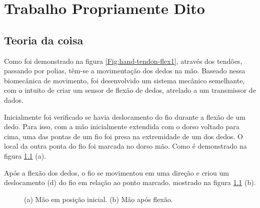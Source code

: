 \documentclass[
	12pt,				%
	openright,			%
	oneside,			%
	a4paper,			%
	english,			%
	brazil				%
	]{abntex2}
\begin{document}
	\chapter{Trabalho Propriamente Dito}

		\section{Teoria da coisa}
			Como foi demonstrado na figura \ref{Fig:hand-tendon-flex1}, através dos tendões, passando por polias, têm-se a movimentação dos dedos na mão. Baseado nessa biomecânica de movimento, foi desenvolvido um sistema mecânico semelhante, com o intuito de criar um sensor de flexão de dedos, atrelado a um transmissor de dados.
			
			Inicialmente foi verificado se havia deslocamento do fio durante a flexão de um dedo. Para isso, com a mão inicialmente extendida com o dorso voltado para cima, uma das pontas de um fio foi presa na extremidade de um dos dedos. O local da outra ponta do fio foi marcada no dorso mão. Como é demonstrado na figura \ref{Fig:hand-wire-steady-and-flex} (a).

			Após a flexão dos dedos, o fio se movimentou em uma direção e criou um deslocamento (d) do fio em relação ao ponto marcado, mostrado na figura \ref{Fig:hand-wire-steady-and-flex} (b).

 

\begin{figure}[!htb]
   \centering
   \caption{ (a) Mão em posição inicial. (b) Mão após flexão.}
   \centering
   \label{Fig:hand-wire-steady-and-flex}
 \end{figure}
\end{document}

